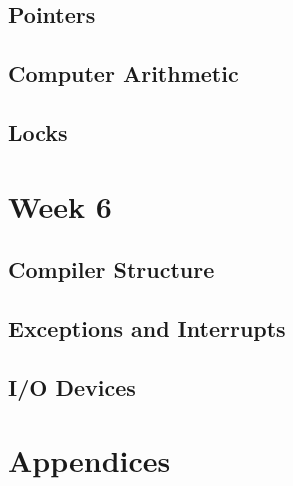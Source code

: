 \documentclass{article}
\begin{document}
\subsection{Pointers}
\subsection{Computer Arithmetic}
\subsection{Locks}
\section{Week 6}
\subsection{Compiler Structure}
\subsection{Exceptions and Interrupts}
\subsection{I/O Devices}

\section{Appendices}
\end{document}
